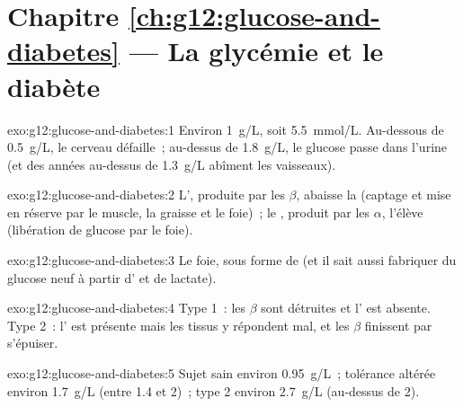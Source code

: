 \section*{Chapitre \ref{ch:g12:glucose-and-diabetes} --- La glycémie et le diabète}

\begin{solution}{exo:g12:glucose-and-diabetes:1}
Environ \qty{1}{g/L}, soit \qty{5.5}{mmol/L}. Au-dessous de
\qty{0.5}{g/L}, le cerveau défaille~; au-dessus de \qty{1.8}{g/L}, le
glucose passe dans l'urine (et des années au-dessus de \qty{1.3}{g/L}
abîment les vaisseaux).
\end{solution}

\begin{solution}{exo:g12:glucose-and-diabetes:2}
L', produite par les  $\beta$, abaisse la 
(captage et mise en réserve par le muscle, la graisse et le foie)~; le
, produit par les  $\alpha$, l'élève (libération de
glucose par le foie).
\end{solution}

\begin{solution}{exo:g12:glucose-and-diabetes:3}
Le foie, sous forme de  (et il sait aussi fabriquer du
glucose neuf à partir d' et de lactate).
\end{solution}

\begin{solution}{exo:g12:glucose-and-diabetes:4}
Type 1~: les  $\beta$ sont détruites et l' est
absente. Type 2~: l' est présente mais les tissus y répondent
mal, et les  $\beta$ finissent par s'épuiser.
\end{solution}

\begin{solution}{exo:g12:glucose-and-diabetes:5}
Sujet sain environ \qty{0.95}{g/L}~; tolérance altérée environ
\qty{1.7}{g/L} (entre 1.4 et 2)~; type 2 environ \qty{2.7}{g/L}
(au-dessus de 2).
\end{solution}

